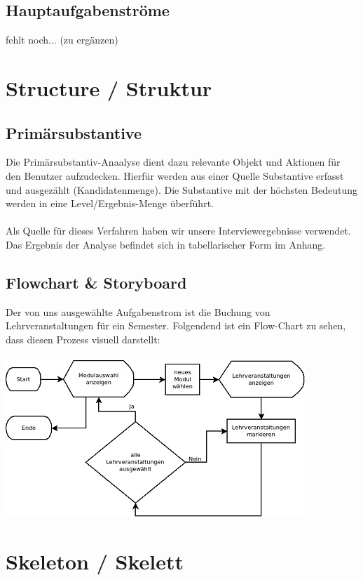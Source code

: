 \documentclass{article}
\begin{document}
\subsection{Hauptaufgabenströme}

fehlt noch... (zu ergänzen)

\newpage

\section{Structure / Struktur}

\subsection{Primärsubstantive}

Die Primärsubstantiv-Anaalyse dient dazu relevante Objekt und Aktionen für den Benutzer aufzudecken. Hierfür werden aus einer Quelle Substantive erfasst und ausgezählt (Kandidatenmenge). Die Substantive mit der höchsten Bedeutung werden in eine Level/Ergebnis-Menge überführt.\\
\\
Als Quelle für dieses Verfahren haben wir unsere Interviewergebnisse verwendet. Das Ergebnis der Analyse befindet sich in tabellarischer Form im Anhang.

\subsection{Flowchart \& Storyboard}

Der von uns ausgewählte Aufgabenstrom ist die Buchung von Lehrveranstaltungen für ein Semester. Folgendend ist ein Flow-Chart zu sehen, dass diesen Prozess visuell darstellt:\\
\\
\includegraphics{flowchart.jpg}
\newpage

\section{Skeleton / Skelett}
\end{document}
